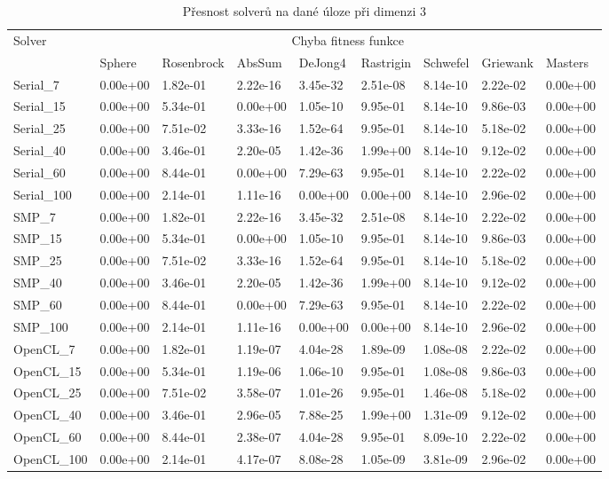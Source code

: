 \documentclass[12pt, a4paper]{report}
\begin{document}
\begin{table}
	\scriptsize
	\caption{Přesnost solverů na dané úloze při dimenzi 3}
	\centering
	\label{tbl:results3}
	\begin{tabular}{l|l|l|l|l|l|l|l|l}
		\multirow{2}{*}{Solver} & \multicolumn{8}{c}{Chyba fitness funkce} \\
		& Sphere & Rosenbrock & AbsSum & DeJong4 & Rastrigin & Schwefel & Griewank & Masters \\
		\hline
		\hline
		Serial\_7 & 0.00e+00 & 1.82e-01 & 2.22e-16 & 3.45e-32 & 2.51e-08 & 8.14e-10 & 2.22e-02 & 0.00e+00 \\
		Serial\_15 & 0.00e+00 & 5.34e-01 & 0.00e+00 & 1.05e-10 & 9.95e-01 & 8.14e-10 & 9.86e-03 & 0.00e+00 \\
		Serial\_25 & 0.00e+00 & 7.51e-02 & 3.33e-16 & 1.52e-64 & 9.95e-01 & 8.14e-10 & 5.18e-02 & 0.00e+00 \\
		Serial\_40 & 0.00e+00 & 3.46e-01 & 2.20e-05 & 1.42e-36 & 1.99e+00 & 8.14e-10 & 9.12e-02 & 0.00e+00 \\
		Serial\_60 & 0.00e+00 & 8.44e-01 & 0.00e+00 & 7.29e-63 & 9.95e-01 & 8.14e-10 & 2.22e-02 & 0.00e+00 \\
		Serial\_100 & 0.00e+00 & 2.14e-01 & 1.11e-16 & 0.00e+00 & 0.00e+00 & 8.14e-10 & 2.96e-02 & 0.00e+00 \\
		\hline
		SMP\_7 & 0.00e+00 & 1.82e-01 & 2.22e-16 & 3.45e-32 & 2.51e-08 & 8.14e-10 & 2.22e-02 & 0.00e+00 \\
		SMP\_15 & 0.00e+00 & 5.34e-01 & 0.00e+00 & 1.05e-10 & 9.95e-01 & 8.14e-10 & 9.86e-03 & 0.00e+00 \\
		SMP\_25 & 0.00e+00 & 7.51e-02 & 3.33e-16 & 1.52e-64 & 9.95e-01 & 8.14e-10 & 5.18e-02 & 0.00e+00 \\
		SMP\_40 & 0.00e+00 & 3.46e-01 & 2.20e-05 & 1.42e-36 & 1.99e+00 & 8.14e-10 & 9.12e-02 & 0.00e+00 \\
		SMP\_60 & 0.00e+00 & 8.44e-01 & 0.00e+00 & 7.29e-63 & 9.95e-01 & 8.14e-10 & 2.22e-02 & 0.00e+00 \\
		SMP\_100 & 0.00e+00 & 2.14e-01 & 1.11e-16 & 0.00e+00 & 0.00e+00 & 8.14e-10 & 2.96e-02 & 0.00e+00 \\
		\hline
		OpenCL\_7 & 0.00e+00 & 1.82e-01 & 1.19e-07 & 4.04e-28 & 1.89e-09 & 1.08e-08 & 2.22e-02 & 0.00e+00 \\
		OpenCL\_15 & 0.00e+00 & 5.34e-01 & 1.19e-06 & 1.06e-10 & 9.95e-01 & 1.08e-08 & 9.86e-03 & 0.00e+00 \\
		OpenCL\_25 & 0.00e+00 & 7.51e-02 & 3.58e-07 & 1.01e-26 & 9.95e-01 & 1.46e-08 & 5.18e-02 & 0.00e+00 \\
		OpenCL\_40 & 0.00e+00 & 3.46e-01 & 2.96e-05 & 7.88e-25 & 1.99e+00 & 1.31e-09 & 9.12e-02 & 0.00e+00 \\
		OpenCL\_60 & 0.00e+00 & 8.44e-01 & 2.38e-07 & 4.04e-28 & 9.95e-01 & 8.09e-10 & 2.22e-02 & 0.00e+00 \\
		OpenCL\_100 & 0.00e+00 & 2.14e-01 & 4.17e-07 & 8.08e-28 & 1.05e-09 & 3.81e-09 & 2.96e-02 & 0.00e+00 \\
	\end{tabular}
\end{table}
\end{document}
